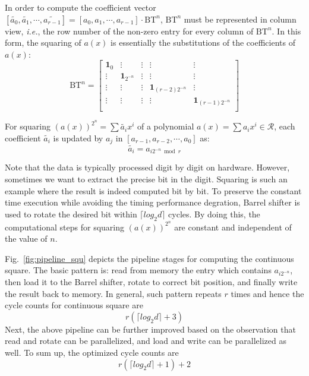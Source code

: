 \documentclass[runningheads]{llncs}
\begin{document}
In order to compute the coefficient vector $[\widetilde{a_{0}},\widetilde{a_{1}},\cdots,\widetilde{a_{r-1}}]=[{a_{0}},{a_{1}},\cdots,{a_{r-1}}]
\cdot \text{BT}^n$, $\text{BT}^n$ must be represented in column view, \textit{i.e.},
the row number of the non-zero entry for every column of $\text{BT}^n$. In this form, the squaring of $a(x)$ is essentially the substitutions of the coefficients of $a(x)$:
\[
\text{BT}^n =
\left[ \begin{array}{ccccc}
\mathbf{1}_{0}&\vdots& \vdots&\vdots&\vdots \\
\vdots&\mathbf{1}_{2^{-n}}&\vdots&\vdots&\vdots\\
\vdots&\vdots&\vdots&\mathbf{1}_{(r-2)2^{-n}}&\vdots\\
\vdots&\vdots&\vdots&\vdots&\mathbf{1}_{(r-1)2^{-n}}\\
\end{array}
\right ]
\]

\begin{theorem}
For squaring $(a(x))^{2^n}=\sum\widetilde{a_{i}}x^i$ of a polynomial $a(x)=\sum a_ix^i \in \mathcal{R}$, each coefficient $\widetilde{a_{i}}$ is updated by $a_{j}$ in $[{a_{r-1}},{a_{r-2}},\cdots,{a_0}]$ as:
\[
    \widetilde{a_{i}} = a_{i2^{-n}\bmod r}
\]
\end{theorem}

Note that the data is typically processed digit by digit on hardware. However, sometimes we want to extract the precise bit in the digit. Squaring is such an example where the result is indeed computed bit by bit. To preserve the constant time execution while avoiding the timing performance degration, Barrel shifter is used to rotate the desired bit within $\lceil log_2d\rceil$ cycles. By doing this, the computational steps for squaring $(a(x))^{2^n}$ are constant and independent of the value of $n$.

Fig.~\ref{fig:pipeline_squ} depicts the pipeline stages for computing the continuous square. The basic pattern is: read from memory the entry which contains $a_{i2^{-n}}$, then load it to the Barrel shifter, rotate to correct bit position, and finally write the result back to memory. In general, such pattern repeats $r$ times and hence the cycle counts for continuous square are
\[
    r(\lceil log_2d\rceil+3)
\]
Next, the above pipeline can be further improved based on the observation that read and rotate can be parallelized, and load and write can be parallelized as well. To sum up, the optimized cycle counts are
\[
    r(\lceil log_2d\rceil+1)+2
\]
\end{document}
